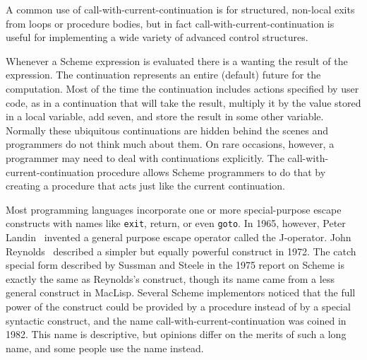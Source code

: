 \begin{entry}{%
}
\begin{rationale}

\vest A common use of {\cf call-with-current-continuation} is for
structured, non-local exits from loops or procedure bodies, but in fact
{\cf call-with-current-continuation} is useful for implementing a
wide variety of advanced control structures.

\vest Whenever a Scheme expression is evaluated there is a
 wanting the result of the expression.  The continuation
represents an entire (default) future for the computation.
Most of the time the continuation includes actions
specified by user code, as in a continuation that will take the result,
multiply it by the value stored in a local variable, add seven, and store
the result in some other variable.  Normally these
ubiquitous continuations are hidden behind the scenes and programmers do not
think much about them.  On rare occasions, however, a programmer may
need to deal with continuations explicitly.
The {\cf call-with-current-continuation} procedure allows Scheme programmers to do
that by creating a procedure that acts just like the current
continuation.

\vest Most programming languages incorporate one or more special-purpose
escape constructs with names like {\tt exit}, \hbox{{\cf return}}, or
even {\tt goto}.  In 1965, however, Peter Landin~\cite{Landin65}
invented a general purpose escape operator called the J-operator.  John
Reynolds~\cite{Reynolds72} described a simpler but equally powerful
construct in 1972.  The {\cf catch} special form described by Sussman
and Steele in the 1975 report on Scheme is exactly the same as
Reynolds's construct, though its name came from a less general construct
in MacLisp.  Several Scheme implementors noticed that the full power of the
 construct could be provided by a procedure instead of by a
special syntactic construct, and the name
{\cf call-with-current-continuation} was coined in 1982.  This name is
descriptive, but opinions differ on the merits of such a long name, and
some people use the name  instead.
\end{rationale}

\end{entry}

